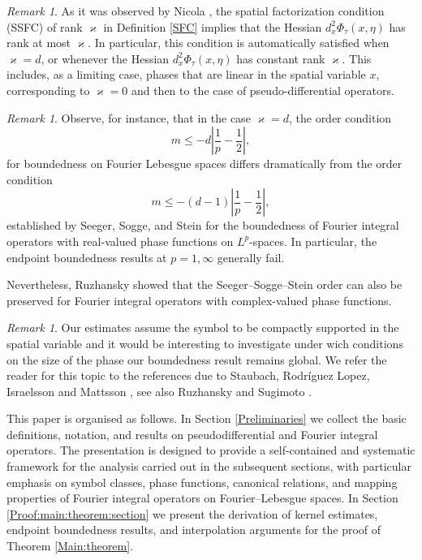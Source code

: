 \documentclass[12pt, reqno]{amsart}
\theoremstyle{definition}
\theoremstyle{remark}
\newtheorem{remark}[theorem]{Remark}
\numberwithin{equation}{section}
\begin{document}
\begin{remark}
     As it was observed by Nicola \cite{Nicola2010}, the spatial factorization condition (SSFC) of rank $\varkappa$ in Definition \ref{SFC} implies that the Hessian
$d_x^2\Phi_\tau(x,\eta)$ has rank at most $\varkappa$. In particular, this condition is automatically satisfied when
$\varkappa=d$, or whenever the Hessian $d_x^2\Phi_\tau(x,\eta)$ has constant rank $\varkappa$.
This includes, as a limiting case, phases that are linear in the spatial
variable $x$, corresponding to $\varkappa=0$ and then to the case of pseudo-differential operators.
\end{remark}
\begin{remark}
    Observe, for instance, that in the case $\varkappa = d$, the order condition
\[
m \leq -d\left|\frac{1}{p}-\frac{1}{2}\right|,
\]
for boundedness on Fourier Lebesgue spaces differs dramatically from the order condition
\[
m \leq -(d-1)\left|\frac{1}{p}-\frac{1}{2}\right|,
\]
established by Seeger, Sogge, and Stein \cite{SSS} for the boundedness of Fourier integral operators with real-valued phase functions on $L^p$-spaces. In particular, the endpoint boundedness results at $p=1,\infty$ generally fail. 

Nevertheless, Ruzhansky \cite{Ruz2001} showed that the Seeger--Sogge--Stein order can also be preserved for Fourier integral operators with complex-valued phase functions.
\end{remark}
\begin{remark}
Our estimates assume the symbol to be compactly supported in the spatial variable and it would be interesting to investigate under wich conditions on the size of the phase our boundedness result remains global. We refer the reader for this topic to the references due to Staubach, Rodr\'iguez Lopez, Israelsson and Mattsson \cite{Staubach2021,Staubach2023,RodriguezLopez2014,RodriguezLopez2015}, see also Ruzhansky and Sugimoto \cite{Ruzhansky2006, Ruzhansky:Sugimoto}. 
\end{remark}

This paper is organised as follows.
In Section \ref{Preliminaries}  we collect the basic definitions, notation, and results on pseudodifferential and Fourier integral operators. The presentation is designed to provide a self-contained and
systematic framework for the analysis carried out in the subsequent sections,
with particular emphasis on symbol classes, phase functions, canonical
relations, and mapping properties of Fourier integral operators on
Fourier--Lebesgue spaces. In Section \ref{Proof:main:theorem:section} we present the derivation of kernel estimates, endpoint boundedness results, and
interpolation arguments for the proof of Theorem \ref{Main:theorem}.
\end{document}
